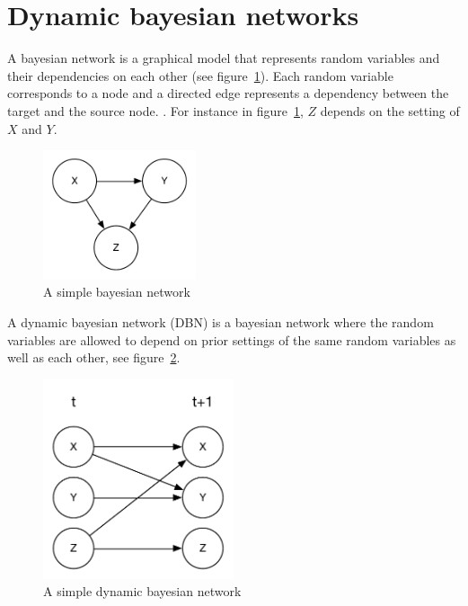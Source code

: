 \section{Dynamic bayesian networks}
\label{sec:dbn}

A bayesian network is a graphical model that represents random variables and
their dependencies on each other (see figure~\ref{fig:bn}). Each random variable
corresponds to a node and a directed edge represents a dependency between the
target and the source node. \parencite{heckerman1998tutorial}. For instance in
figure~\ref{fig:bn}, $Z$ depends on the setting of $X$ and $Y$. 

\begin{figure}[H]
\centering
\includegraphics[width=0.4\textwidth]{images/BN.pdf}
\caption{A simple bayesian network}
\label{fig:bn}
\end{figure}

A dynamic bayesian network (DBN) is a bayesian network where the random
variables are allowed to depend on prior settings of the same random variables
as well as each other, see figure~\ref{fig:dbn}.

\begin{figure}[H]
    \centering
    \includegraphics[width=0.5\textwidth]{images/DBN.pdf}
    \caption{A simple dynamic bayesian network}
    \label{fig:dbn}
\end{figure}

